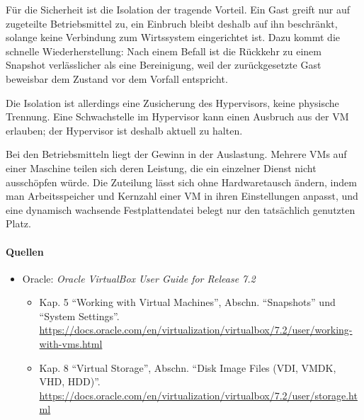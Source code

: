 Für die Sicherheit ist die Isolation der tragende Vorteil. Ein Gast greift nur auf zugeteilte Betriebsmittel zu, ein Einbruch bleibt deshalb auf ihn beschränkt, solange keine Verbindung zum Wirtssystem eingerichtet ist. Dazu kommt die schnelle Wiederherstellung: Nach einem Befall ist die Rückkehr zu einem Snapshot verlässlicher als eine Bereinigung, weil der zurückgesetzte Gast beweisbar dem Zustand vor dem Vorfall entspricht.

Die Isolation ist allerdings eine Zusicherung des Hypervisors, keine physische Trennung. Eine Schwachstelle im Hypervisor kann einen Ausbruch aus der VM erlauben; der Hypervisor ist deshalb aktuell zu halten.

Bei den Betriebsmitteln liegt der Gewinn in der Auslastung. Mehrere VMs auf einer Maschine teilen sich deren Leistung, die ein einzelner Dienst nicht ausschöpfen würde. Die Zuteilung lässt sich ohne Hardwaretausch ändern, indem man Arbeitsspeicher und Kernzahl einer VM in ihren Einstellungen anpasst, und eine dynamisch wachsende Festplattendatei belegt nur den tatsächlich genutzten Platz.

\paragraph{Quellen}
\begin{itemize}[quellen]
  \item Oracle: \emph{Oracle VirtualBox User Guide for Release 7.2}
  \begin{itemize}[nosep]
    \item Kap. 5 \enquote{Working with Virtual Machines}, Abschn. \enquote{Snapshots} und \enquote{System Settings}. \url{https://docs.oracle.com/en/virtualization/virtualbox/7.2/user/working-with-vms.html}
    \item Kap. 8 \enquote{Virtual Storage}, Abschn. \enquote{Disk Image Files (VDI, VMDK, VHD, HDD)}. \url{https://docs.oracle.com/en/virtualization/virtualbox/7.2/user/storage.html}
  \end{itemize}
\end{itemize}
